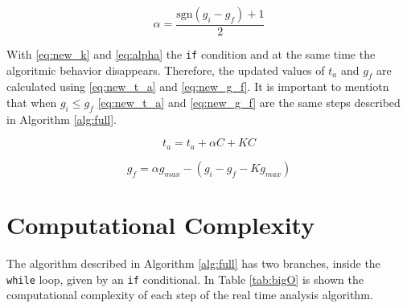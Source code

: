 \documentclass[
  12pt,
  a4paperpaper,
]{report}
\begin{document}
\begin{equation}
\alpha =  \frac{ \mathrm{sgn}(g_i-g_f) + 1 }{2}
\label{eq:alpha}
\end{equation}

With \ref{eq:new_k} and \ref{eq:alpha} the \texttt{if} condition and at the same time the algoritmic behavior disappears. 
Therefore, the updated values of \(t_a\) and \(g_f\) are calculated using
\ref{eq:new_t_a} and \ref{eq:new_g_f}. 
It is important to mentiotn that  when
\(g_i \leq g_f\) \ref{eq:new_t_a} and \ref{eq:new_g_f} are the same steps described in Algorithm \ref{alg:full}.

\begin{equation}
t_a = t_a + \alpha C+ KC
\label{eq:new_t_a}
\end{equation}

\begin{equation}
g_f = \alpha g_{max} - (g_i -  g_f - K g_{max} )
\label{eq:new_g_f}
\end{equation}

\hypertarget{computational-complexity}{%
\section{Computational Complexity}\label{computational-complexity}}

The algorithm described in Algorithm \ref{alg:full} has two branches,
inside the \texttt{while} loop, given by an \texttt{if} conditional. In
Table \ref{tab:bigO} is shown the computational complexity of each step
of the real time analysis algorithm.
\end{document}
